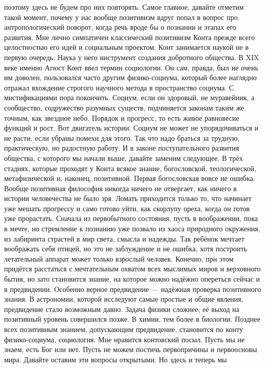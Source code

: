 поэтому здесь не будем про них повторять. Самое главное, давайте отметим такой
момент, почему у нас вообще позитивизм вдруг попал в вопрос про
антропологический поворот, когда речь вроде бы о познании и этапах его развития.
Мне лично симпатичен классический позитивизм Конта прежде всего целостностью его
идей и социальным проектом. Конт занимается наукой не в первую очередь. Наука у
него инструмент создания добротного общества. В XIX веке именно Агюст Конт ввел
термин социологии. Он сам, правда, был не очень им доволен, пользовался часто
другим физико-социума, который более наглядно отражал вхождение строгого
научного метода в пространство социума. С мистификациями пора покончить. Социум,
если он здоровый, не муравейник, а сообщество, содружество разумных существ,
подчиняется законам таким же точным, как звездное небо. Порядок и прогресс, то
есть живое равновесие функций и рост. Вот двигатель истории. Социум не может не
упорядочиваться и не расти, если убраны помехи для этого. Так что надо браться
за трудную, практическую, но радостную работу. И в законе поступательного
развития общества, с которого мы начали выше, давайте заменим следующее. В трёх
стадиях, которые проходят у Конта всякое знание, богословской, теологической,
метафизической и, наконец, позитивной. Первая богословская вовсе не ошибка.
Вообще позитивная философия никогда ничего не отвергает, как ничего в истории
человечества не было зря. Ломать приходится только то, что начинает уже мешать
прогрессу и само готово уйти, как скорлупу ореха, когда он готов уже прорастать.
Сначала из первобытного состояния, пусть в воображении, пока в мечте, но
стремление к познанию уже позвало из хаоса природного окружения, из лабиринта
страстей в мир света, смысла и надежды. Так ребёнок мечтает воображать себя
птицей, но это не заблуждение и не ошибка, хотя построить летательный аппарат
может только взрослый человек. Конечно, при этом придётся расстаться с
мечтательным охватом всех мыслимых миров и верховного бытия, но зато становится
знание, на которое можно надёжно опереться сейчас и в предвидении. Особенно
верное предвидение — надёжная проверка позитивного знания. В астрономии, которой
исследуют самые простые и общие явления, предвидение стало возможным давно.
Задача физики сложнее, её выход на позитивный уровень совершился позже. В химии,
тем более в биологии. Позднее всех позитивным знанием, допускающим предвидение,
становится по конту физико-социума, социология. Мне нравится контовский посыл.
Пусть мы не знаем, есть Бог или нет. Пусть не можем постичь первопричины и
первоосновы мира. Давайте оставим эти вопросы открытыми. Но здесь и теперь мы
